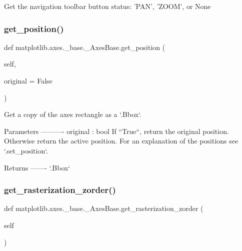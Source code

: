 \begin{DoxyVerb}Get the navigation toolbar button status: 'PAN', 'ZOOM', or None
\end{DoxyVerb}
 \mbox{\label{classmatplotlib_1_1axes_1_1__base_1_1__AxesBase_a0dbba70eb3a1b99a4b118560bb0bf52f}} 
\subsubsection{\texorpdfstring{get\+\_\+position()}{get\_position()}}
{\footnotesize\ttfamily def matplotlib.\+axes.\+\_\+base.\+\_\+\+Axes\+Base.\+get\+\_\+position (\begin{DoxyParamCaption}\item[{}]{self,  }\item[{}]{original = {\ttfamily False} }\end{DoxyParamCaption})}

\begin{DoxyVerb}Get a copy of the axes rectangle as a `.Bbox`.

Parameters
----------
original : bool
    If ``True``, return the original position. Otherwise return the
    active position. For an explanation of the positions see
    `.set_position`.

Returns
-------
`.Bbox`\end{DoxyVerb}
 \mbox{\label{classmatplotlib_1_1axes_1_1__base_1_1__AxesBase_a334a07121fde9d9fefe46aeb4720a4e1}} 
\subsubsection{\texorpdfstring{get\+\_\+rasterization\+\_\+zorder()}{get\_rasterization\_zorder()}}
{\footnotesize\ttfamily def matplotlib.\+axes.\+\_\+base.\+\_\+\+Axes\+Base.\+get\+\_\+rasterization\+\_\+zorder (\begin{DoxyParamCaption}\item[{}]{self }\end{DoxyParamCaption})}

